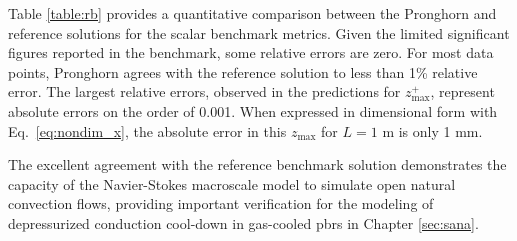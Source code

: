 Table \ref{table:rb} provides a quantitative comparison between the Pronghorn and reference solutions for the scalar benchmark metrics. Given the limited significant figures reported in the benchmark, some relative errors are zero. For most data points, Pronghorn agrees with the reference solution to less than 1\% relative error. The largest relative errors, observed in the predictions for \(z^+_\text{max}\), represent absolute errors on the order of 0.001. When expressed in dimensional form with Eq.\ \eqref{eq:nondim_x}, the absolute error in this \(z_\text{max}\) for \(L=1\) \si{\meter} is only 1 \si{\milli\meter}.

The excellent agreement with the reference benchmark solution demonstrates the capacity of the Navier-Stokes macroscale model to simulate open natural convection flows, providing important verification for the modeling of depressurized conduction cool-down in gas-cooled \glspl{pbr} in Chapter \ref{sec:sana}.


